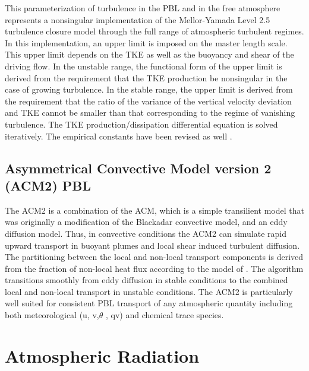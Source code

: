 This parameterization of turbulence in the PBL and in the free atmosphere 
\citep{janjic90,janjic96,janjic02} represents a nonsingular implementation of 
the Mellor-Yamada Level 2.5 turbulence closure model \citep{melloryamada82} 
through the full range of atmospheric turbulent regimes. 
In this implementation, an upper limit is imposed on the master length scale. 
This upper limit depends on the TKE as well as the buoyancy and shear of the driving flow. 
In the unstable range, the functional form of the upper limit is derived from the 
requirement that the TKE production be nonsingular in the case of growing turbulence. 
In the stable range, the upper limit is derived from the requirement that the 
ratio of the variance of the vertical velocity deviation and TKE cannot be 
smaller than that corresponding to the regime of vanishing turbulence. 
The TKE production/dissipation differential equation is solved iteratively. 
The empirical constants have been revised as well \citep{janjic96,janjic02}. 

\subsection{Asymmetrical Convective Model version 2 (ACM2) PBL}

The ACM2 \citep{pleim07} is a combination of the ACM, which is a simple transilient model that was originally a modification of the Blackadar convective model, and an eddy diffusion model.  Thus, in convective conditions the ACM2 can simulate rapid upward transport in buoyant plumes and local shear induced turbulent diffusion.  The partitioning between the local and non-local transport components is derived from the fraction of non-local heat flux according to the model of \citet{holtslag93}.  The algorithm transitions smoothly from eddy diffusion in stable conditions to the combined local and non-local transport in unstable conditions.  The ACM2 is particularly well suited for consistent PBL transport of any atmospheric quantity including both meteorological (u, v,$\theta$ , qv) and chemical trace species.

\section{Atmospheric Radiation}

